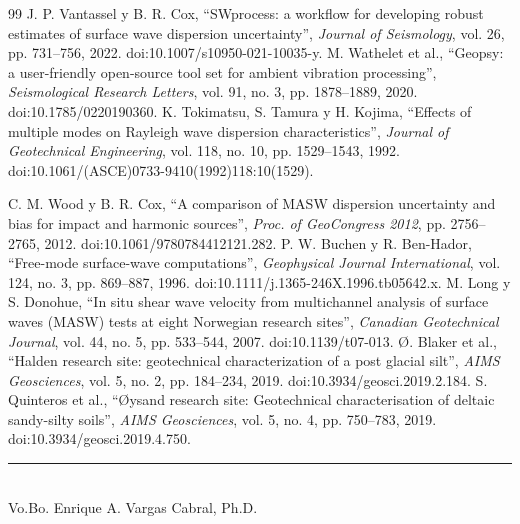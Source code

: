 \documentclass[11pt,a4paper]{article}
\newcommand{\tutor}{Enrique A. Vargas Cabral, Ph.D.}
\begin{document}
\begin{thebibliography}{99}
		 J. P. Vantassel y B. R. Cox, ``SWprocess: a workflow for developing robust estimates of surface wave dispersion uncertainty'', \textit{Journal of Seismology}, vol. 26, pp. 731--756, 2022. doi:10.1007/s10950-021-10035-y.
		 M. Wathelet et al., ``Geopsy: a user-friendly open-source tool set for ambient vibration processing'', \textit{Seismological Research Letters}, vol. 91, no. 3, pp. 1878--1889, 2020. doi:10.1785/0220190360.
		 K. Tokimatsu, S. Tamura y H. Kojima, ``Effects of multiple modes on Rayleigh wave dispersion characteristics'', \textit{Journal of Geotechnical Engineering}, vol. 118, no. 10, pp. 1529--1543, 1992. doi:10.1061/(ASCE)0733-9410(1992)118:10(1529).
		
		 C. M. Wood y B. R. Cox, ``A comparison of MASW dispersion uncertainty and bias for impact and harmonic sources'', \textit{Proc. of GeoCongress 2012}, pp. 2756--2765, 2012. doi:10.1061/9780784412121.282.
		 P. W. Buchen y R. Ben-Hador, ``Free-mode surface-wave computations'', \textit{Geophysical Journal International}, vol. 124, no. 3, pp. 869--887, 1996. doi:10.1111/j.1365-246X.1996.tb05642.x.
		 M. Long y S. Donohue, ``In situ shear wave velocity from multichannel analysis of surface waves (MASW) tests at eight Norwegian research sites'', \textit{Canadian Geotechnical Journal}, vol. 44, no. 5, pp. 533--544, 2007. doi:10.1139/t07-013.
		 \O. Blaker et al., ``Halden research site: geotechnical characterization of a post glacial silt'', \textit{AIMS Geosciences}, vol. 5, no. 2, pp. 184--234, 2019. doi:10.3934/geosci.2019.2.184.
		 S. Quinteros et al., ``\O{}ysand research site: Geotechnical characterisation of deltaic sandy-silty soils'', \textit{AIMS Geosciences}, vol. 5, no. 4, pp. 750--783, 2019. doi:10.3934/geosci.2019.4.750.
	\end{thebibliography}
	
	\vspace{0.15em}
	\begin{flushright}
		\rule{6.0cm}{0.4pt}\\[-0.1em]
		{\small Vo.Bo. \tutor}
	\end{flushright}
	
\end{document}

